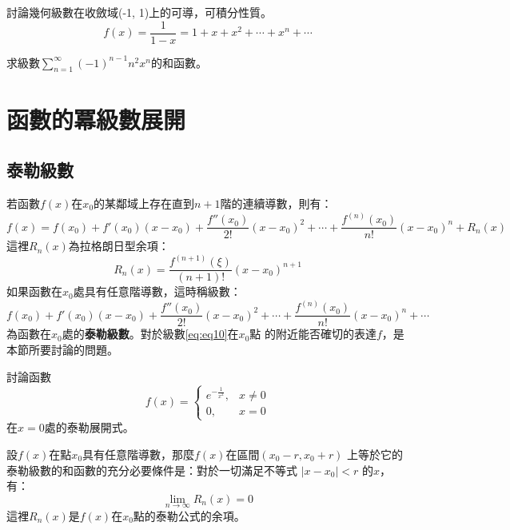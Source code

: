 \documentclass[a4paper,12pt]{article}
\theoremstyle{theorem}
\begin{document}
\begin{CJK*}{UTF8}{bsmi}
\begin{example}
    討論幾何級數在收斂域(-1, 1)上的可導，可積分性質。
    \[
        f(x) = \frac{1}{1-x} = 1 + x + x^2 + \cdots + x^n + \cdots
    \]
\end{example}

\begin{example}
    求級數$\displaystyle \sum_{n=1}^{\infty} (-1)^{n-1}n^2x^n$的和函數。
\end{example}


    \section{函數的冪級數展開}
    \subsection{泰勒級數}
    若函數$f(x)$在$x_0$的某鄰域上存在直到$n+1$階的連續導數，則有：
    \begin{equation}
        f(x) = f(x_0) + f'(x_0)(x - x_0) + \frac{f''(x_0)}{2!}(x - x_0)^2 
               + \cdots + \frac{f^{(n)}(x_0)}{n!}(x - x_0)^n + R_n(x)
               \label{eq:eq8}
    \end{equation}
    這裡$R_n(x)$為拉格朗日型余項：
    \begin{equation}
        R_n(x) = \frac{f^{(n+1)}(\xi)}{(n+1)!}(x - x_0)^{n+1}
        \label{eq:eq9}
    \end{equation}
    如果函數在$x_0$處具有任意階導數，這時稱級數：
    \begin{equation}
         f(x_0) + f'(x_0)(x - x_0) + \frac{f''(x_0)}{2!}(x - x_0)^2 
                + \cdots + \frac{f^{(n)}(x_0)}{n!}(x - x_0)^n + \cdots
        \label{eq:eq10}
    \end{equation}
    為函數在$x_0$處的\textbf{泰勒級數}。對於級數\ref{eq:eq10}在$x_0$點
    的附近能否確切的表達$f$，是本節所要討論的問題。

    \begin{example}
        討論函數 
        \[
            f(x) = \left\{ \begin{array}{ll} 
                e^{-\frac{1}{x^2}}, & x \ne 0 \\
                0,                  & x = 0
            \end{array} \right.
        \]
        在$x = 0$處的泰勒展開式。
    \end{example}

    \begin{theorem}
        設$f(x)$在點$x_0$具有任意階導數，那麼$f(x)$在區間$(x_0-r, x_0+r)$
        上等於它的泰勒級數的和函數的充分必要條件是：對於一切滿足不等式 
        $\displaystyle \vert x - x_0 \vert < r$ 的$x$，有：
        \[
            \lim_{n \to \infty} R_n(x) = 0
        \]
        這裡$R_n(x)$是$f(x)$在$x_0$點的泰勒公式的余項。
    \end{theorem}


\end{CJK*}
\end{document}
